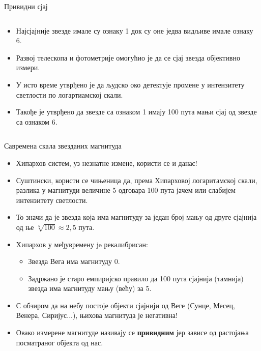 \documentclass[aspectratio=169, xcolor=table, 10pt]{beamer}
\theoremstyle{definition}
\begin{document}
\begin{frame}{Привидни сјај}
\begin{columns}[T]
\begin{column}{0.65\textwidth}
\begin{itemize}
        \item Најсјајније звезде имале су ознаку 1 док су оне једва видљиве имале ознаку 6.
        \item Развој телескопа и фотометрије омогућио је да се сјај звезда објективно измери.
        \item У исто време утврђено је да људско око детектује промене у интензитету светлости по логартиамској скали.
        \item Такође је утврђено да звезде са ознаком 1 имају 100 пута мањи сјај од звезде са ознаком 6.
      \end{itemize}
    \end{column}
  \end{columns}
\end{frame}

\begin{frame}{Савремена скала звезданих магнитуда}
  \begin{itemize}
    \item Хипархов систем, уз незнатне измене, користи се и данас!
    \item Суштински, користи се чињеница да, према Хипарховој логаритамској скали, разлика у магнитуди величине 5 одговара 100 пута јачем или слабијем интензитету светлости.
    \item То значи да је звезда која има магнитуду за један број мању од друге сјајнија од ње $\sqrt[5]{100}\approx2,5$ пута.
    \item Хипархов у међувремену je рекалибрисан:
    \begin{itemize}
      \item Звезда Вега има магнитуду 0.
      \item Задржано је старо емпиријско правило да 100 пута сјајнија (тамнија) звезда има магнитуду мању (већу) за 5.
    \end{itemize}
  \item С обзиром да на небу постоје објекти сјајнији од Веге (Сунце, Месец, Венера, Сиријус...), њихова магнитуда је негативна!
  \item Овако измерене магнитуде називају се \textbf{привидним} јер зависе од растојања посматраног објекта од нас.
  \end{itemize}
\end{frame}
\end{document}

